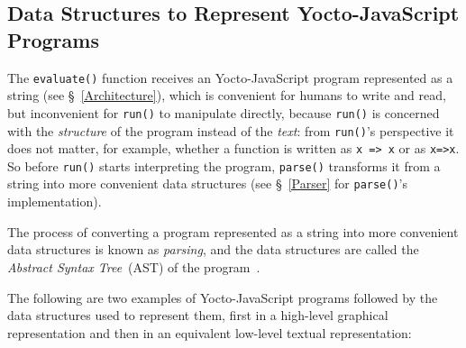 \documentclass[12pt, oneside]{book}
\begin{document}
\subsection{Data Structures to Represent Yocto-JavaScript Programs}
\label{Data Structures to Represent Yocto-JavaScript Programs}

The \texttt{evaluate()} function receives an Yocto-JavaScript program represented as a string (see §~\ref{Architecture}), which is convenient for humans to write and read, but inconvenient for \texttt{run()} to manipulate directly, because \texttt{run()} is concerned with the \emph{structure} of the program instead of the \emph{text}: from \texttt{run()}’s perspective it does not matter, for example, whether a function is written as \texttt{x => x} or as \texttt{x=>x}. So before \texttt{run()} starts interpreting the program, \texttt{parse()} transforms it from a string into more convenient data structures (see §~\ref{Parser} for \texttt{parse()}’s implementation).

\begin{mdframed}[frametitle = {Technical Terms}]
The process of converting a program represented as a string into more convenient data structures is known as \emph{parsing}, and the data structures are called the \emph{Abstract Syntax Tree}~(AST) of the program~\cite[§~4]{dragon-book}.
\end{mdframed}

The following are two examples of Yocto-JavaScript programs followed by the data structures used to represent them, first in a high-level graphical representation and then in an equivalent low-level textual representation:
\end{document}
